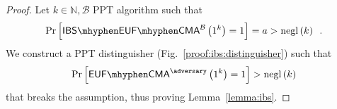     \begin{proof}
      Let $k \in \mathbb{N}, \mathcal{B}$ PPT algorithm such that
      \begin{equation*}
        \Pr\left[\mathsf{IBS \mhyphen EUF \mhyphen
        CMA}^{\mathcal{B}}\left(1^k\right) = 1\right] = a >
        \mathrm{negl}\left(k\right) \enspace.
      \end{equation*}
      We construct a PPT distinguisher \adversary{}
      (Fig.~\ref{proof:ibs:distinguisher}) such that
      \begin{equation*}
        \Pr\left[\mathsf{EUF \mhyphen CMA}^{\adversary}\left(1^k\right) =
        1\right] > \mathrm{negl}\left(k\right)
      \end{equation*}
      that breaks the assumption, thus proving Lemma~\ref{lemma:ibs}.


\end{proof}
